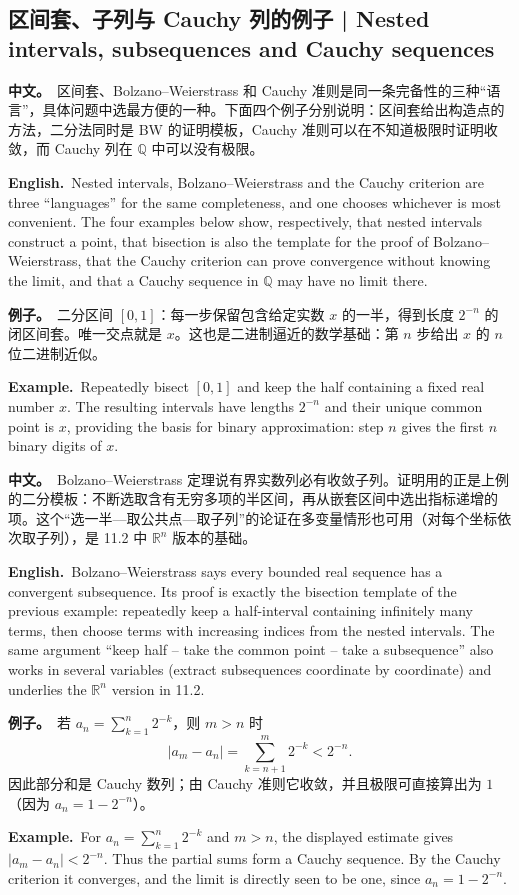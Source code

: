 \documentclass[UTF8,11pt,a4paper]{ctexart}
\newcommand{\BOTH}[2]{\par\noindent\textbf{中文。}\ #1\par\noindent\textbf{English.}\ #2\par}
\newcommand{\EX}[2]{\par\noindent\textbf{例子。}\ #1\par\noindent\textbf{Example.}\ #2\par}
\begin{document}
\subsection{区间套、子列与 Cauchy 列的例子 | Nested intervals, subsequences and Cauchy sequences}
\BOTH{区间套、Bolzano--Weierstrass 和 Cauchy 准则是同一条完备性的三种“语言”，具体问题中选最方便的一种。下面四个例子分别说明：区间套给出构造点的方法，二分法同时是 BW 的证明模板，Cauchy 准则可以在不知道极限时证明收敛，而 Cauchy 列在 $\mathbb Q$ 中可以没有极限。}{Nested intervals, Bolzano--Weierstrass and the Cauchy criterion are three “languages” for the same completeness, and one chooses whichever is most convenient. The four examples below show, respectively, that nested intervals construct a point, that bisection is also the template for the proof of Bolzano--Weierstrass, that the Cauchy criterion can prove convergence without knowing the limit, and that a Cauchy sequence in $\mathbb Q$ may have no limit there.}
\EX{二分区间 $[0,1]$：每一步保留包含给定实数 $x$ 的一半，得到长度 $2^{-n}$ 的闭区间套。唯一交点就是 $x$。这也是二进制逼近的数学基础：第 $n$ 步给出 $x$ 的 $n$ 位二进制近似。}{Repeatedly bisect $[0,1]$ and keep the half containing a fixed real number $x$. The resulting intervals have lengths $2^{-n}$ and their unique common point is $x$, providing the basis for binary approximation: step $n$ gives the first $n$ binary digits of $x$.}
\BOTH{Bolzano--Weierstrass 定理说有界实数列必有收敛子列。证明用的正是上例的二分模板：不断选取含有无穷多项的半区间，再从嵌套区间中选出指标递增的项。这个“选一半—取公共点—取子列”的论证在多变量情形也可用（对每个坐标依次取子列），是 11.2 中 $\mathbb R^n$ 版本的基础。}{Bolzano--Weierstrass says every bounded real sequence has a convergent subsequence. Its proof is exactly the bisection template of the previous example: repeatedly keep a half-interval containing infinitely many terms, then choose terms with increasing indices from the nested intervals. The same argument “keep half -- take the common point -- take a subsequence” also works in several variables (extract subsequences coordinate by coordinate) and underlies the $\mathbb R^n$ version in 11.2.}
\EX{若 $a_n=\sum_{k=1}^n2^{-k}$，则 $m>n$ 时
\[
|a_m-a_n|=\sum_{k=n+1}^{m}2^{-k}<2^{-n}.
\]
因此部分和是 Cauchy 数列；由 Cauchy 准则它收敛，并且极限可直接算出为 $1$（因为 $a_n=1-2^{-n}$）。}{For $a_n=\sum_{k=1}^n2^{-k}$ and $m>n$, the displayed estimate gives $|a_m-a_n|<2^{-n}$. Thus the partial sums form a Cauchy sequence. By the Cauchy criterion it converges, and the limit is directly seen to be one, since $a_n=1-2^{-n}$.}
\end{document}

